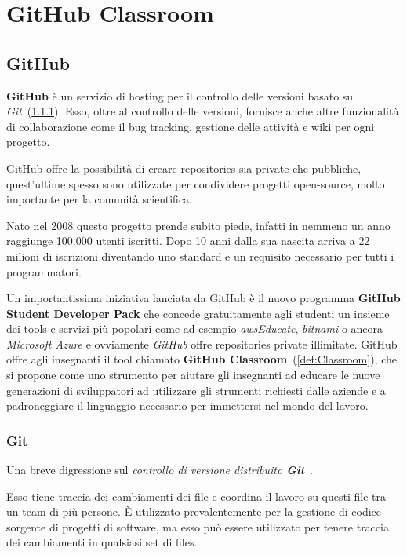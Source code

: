 
\chapter{GitHub Classroom}
	\section{GitHub}\label{def:GitHub}
		\textbf{GitHub} è un servizio di hosting per il controllo delle versioni basato su \textit{Git}~(\ref{def:Git}).
		Esso, oltre al controllo delle versioni, fornisce anche altre funzionalità di collaborazione come il bug tracking, gestione delle attività e wiki per ogni progetto.
		
		GitHub offre la possibilità di creare repositories sia private che pubbliche, quest'ultime spesso sono utilizzate per condividere progetti open-source, molto importante per la comunità scientifica.
		
		Nato nel 2008 questo progetto prende subito piede, infatti in nemmeno un anno raggiunge 100.000 utenti iscritti. Dopo 10 anni dalla sua nascita arriva a 22 milioni di iscrizioni diventando uno standard  e un requisito necessario per tutti i programmatori.
		
		Un importantissima iniziativa lanciata da GitHub è il nuovo programma \textbf{GitHub Student Developer Pack} che concede gratuitamente agli studenti un insieme dei tools e servizi più popolari come ad esempio \textit{awsEducate}, \textit{bitnami} o ancora \textit{Microsoft Azure} e ovviamente \textit{GitHub} offre repositories private illimitate.
		GitHub offre agli insegnanti il tool chiamato \textbf{GitHub Classroom}~(\ref{def:Classroom}), che si propone come uno strumento per aiutare gli insegnanti ad  educare le nuove generazioni di sviluppatori ad utilizzare gli strumenti richiesti dalle aziende e a padroneggiare il linguaggio necessario per immettersi nel mondo del lavoro.
	
		\subsection{Git}\label{def:Git}
			Una breve digressione sul \textit{controllo di versione distribuito \textbf{Git}}~\citep{ProGit2018}.
			
			Esso tiene traccia dei cambiamenti dei file e coordina il lavoro su questi file tra un team di più persone.
			\`E utilizzato prevalentemente per la gestione di codice sorgente di progetti di software, ma esso può essere utilizzato per tenere traccia dei cambiamenti in  qualsiasi set di files.
			
